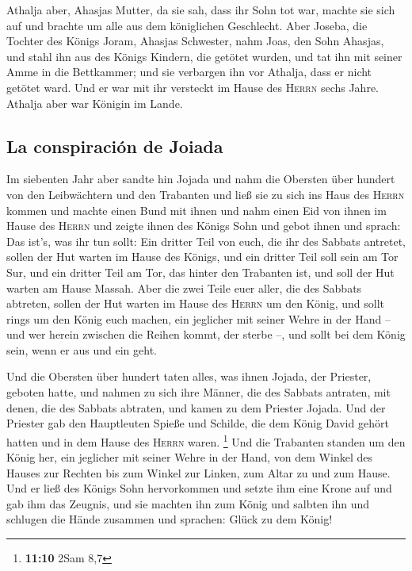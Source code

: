  Athalja aber, Ahasjas Mutter, da sie sah, dass ihr Sohn
tot war, machte sie sich auf und brachte um alle aus dem königlichen
Geschlecht.  Aber Joseba, die Tochter des Königs Joram,
Ahasjas Schwester, nahm Joas, den Sohn Ahasjas, und stahl ihn aus des
Königs Kindern, die getötet wurden, und tat ihn mit seiner Amme in die
Bettkammer; und sie verbargen ihn vor Athalja, dass er nicht getötet
ward.  Und er war mit ihr versteckt im Hause des
\textsc{Herrn} sechs Jahre. Athalja aber war Königin im Lande.

\hypertarget{la-conspiraciuxf3n-de-joiada}{%
\subsection{La conspiración de
Joiada}\label{la-conspiraciuxf3n-de-joiada}}

 Im siebenten Jahr aber sandte hin Jojada und nahm die
Obersten über hundert von den Leibwächtern und den Trabanten und ließ
sie zu sich ins Haus des \textsc{Herrn} kommen und machte einen Bund mit
ihnen und nahm einen Eid von ihnen im Hause des \textsc{Herrn} und
zeigte ihnen des Königs Sohn  und gebot ihnen und sprach:
Das ist's, was ihr tun sollt: Ein dritter Teil von euch, die ihr des
Sabbats antretet, sollen der Hut warten im Hause des Königs,
 und ein dritter Teil soll sein am Tor Sur, und ein
dritter Teil am Tor, das hinter den Trabanten ist, und soll der Hut
warten am Hause Massah.  Aber die zwei Teile euer aller,
die des Sabbats abtreten, sollen der Hut warten im Hause des
\textsc{Herrn} um den König,  und sollt rings um den König
euch machen, ein jeglicher mit seiner Wehre in der Hand -- und wer
herein zwischen die Reihen kommt, der sterbe --, und sollt bei dem König
sein, wenn er aus und ein geht.

 Und die Obersten über hundert taten alles, was ihnen
Jojada, der Priester, geboten hatte, und nahmen zu sich ihre Männer, die
des Sabbats antraten, mit denen, die des Sabbats abtraten, und kamen zu
dem Priester Jojada.  Und der Priester gab den
Hauptleuten Spieße und Schilde, die dem König David gehört hatten und in
dem Hause des \textsc{Herrn} waren. \footnote{\textbf{11:10} 2Sam 8,7}
 Und die Trabanten standen um den König her, ein
jeglicher mit seiner Wehre in der Hand, von dem Winkel des Hauses zur
Rechten bis zum Winkel zur Linken, zum Altar zu und zum Hause.
 Und er ließ des Königs Sohn hervorkommen und setzte ihm
eine Krone auf und gab ihm das Zeugnis, und sie machten ihn zum König
und salbten ihn und schlugen die Hände zusammen und sprachen: Glück zu
dem König!

